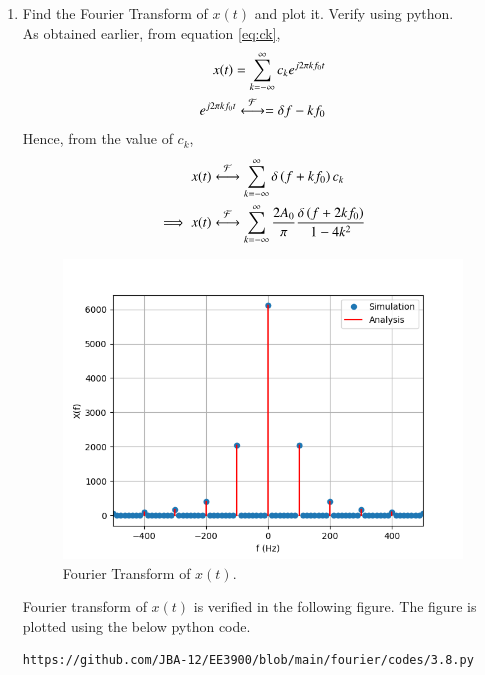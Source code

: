 \documentclass[journal,12pt,twocolumn]{IEEEtran}
\renewcommand\thesection{\arabic{section}}
\begin{document}
\begin{enumerate}[label=\thesection.\arabic*
	,ref=\thesection.\theenumi]
	\item Find the Fourier Transform of $x(t)$ and plot it. Verify using python.\\
	\solution As obtained earlier, from equation \eqref{eq:ck},
	\begin{align}
		x(t)=\sum_{k=-\infty}^{\infty}c_k e^{j2\pi k f_0 t}\\
		e^{j 2 \pi k f_0 t}\overset{\mathcal{F}}{ \longleftrightarrow}=\delta{f-kf_0}
	\end{align}
	Hence, from the value of $c_k$,
	\begin{align}
 x(t)&\overset{\mathcal{F}}{ \longleftrightarrow}\sum_{k=-\infty}^{\infty} \delta\left(f+kf_0\right) c_k\\
		\implies x(t)&\overset{\mathcal{F}}{ \longleftrightarrow}\sum_{k=-\infty}^{\infty} \frac{2A_0}{\pi} \frac{\delta\left(f+2kf_0\right)}{1-4k^2} 
	\end{align} 
	\begin{figure}[!ht]
				\includegraphics[width=\columnwidth]{figs/3.8.png}
				\caption{Fourier Transform of $x(t)$.}
				\label{fig:fourier-xt}
			\end{figure}
	Fourier transform of $x(t)$ is verified in the following figure. 
	The figure is plotted using the below python code.
	\begin{lstlisting}
https://github.com/JBA-12/EE3900/blob/main/fourier/codes/3.8.py
	\end{lstlisting} 

\end{enumerate}
\end{document}
